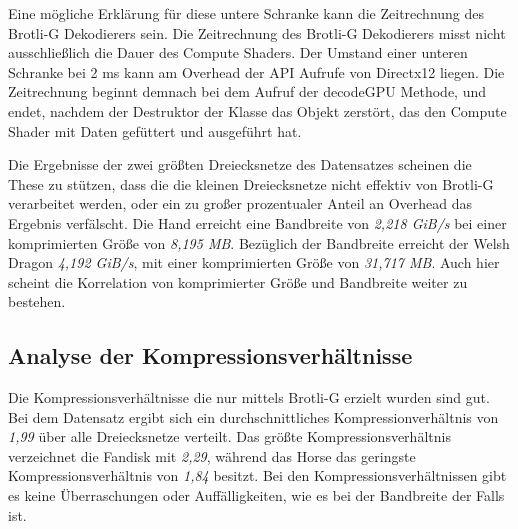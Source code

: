 Eine mögliche Erklärung für diese untere Schranke kann die Zeitrechnung des Brotli-G Dekodierers sein.
Die Zeitrechnung des Brotli-G Dekodierers misst nicht ausschließlich die Dauer des Compute Shaders.
Der Umstand einer unteren Schranke bei 2 ms kann am Overhead der API Aufrufe von Directx12 liegen.
Die Zeitrechnung beginnt demnach bei dem Aufruf der decodeGPU Methode, und endet, nachdem der Destruktor der Klasse das Objekt zerstört, das den Compute Shader mit Daten gefüttert und ausgeführt hat. \newline

Die Ergebnisse der zwei größten Dreiecksnetze des Datensatzes scheinen die These zu stützen, dass die die kleinen Dreiecksnetze nicht effektiv von Brotli-G verarbeitet werden, oder ein zu großer prozentualer Anteil an Overhead das Ergebnis verfälscht.
Die Hand erreicht eine Bandbreite von \textit{2,218 GiB/s} bei einer komprimierten Größe von \textit{8,195 MB}.
Bezüglich der Bandbreite erreicht der Welsh Dragon \textit{4,192 GiB/s}, mit einer komprimierten Größe von \textit{31,717 MB}.
Auch hier scheint die Korrelation von komprimierter Größe und Bandbreite weiter zu bestehen.

\subsection{Analyse der Kompressionsverhältnisse}
\label{subsec:ana_ratios}
Die Kompressionsverhältnisse die nur mittels Brotli-G erzielt wurden sind gut.
Bei dem Datensatz ergibt sich ein durchschnittliches Kompressionverhältnis von \textit{1,99} über alle Dreiecksnetze verteilt.
Das größte Kompressionsverhältnis verzeichnet die Fandisk mit \textit{2,29}, während das Horse das geringste Kompressionsverhältnis von \textit{1,84} besitzt.
Bei den Kompressionsverhältnissen gibt es keine Überraschungen oder Auffälligkeiten, wie es bei der Bandbreite der Falls ist.

